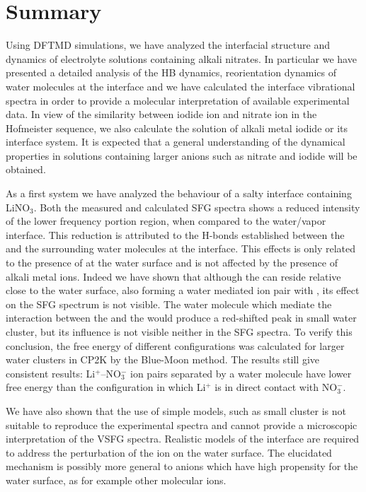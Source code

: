 \chapter{Summary}\label{CHAPTER_Summary}
Using DFTMD simulations, we have analyzed the interfacial structure and dynamics of electrolyte solutions containing alkali nitrates.
In particular we have presented a detailed analysis of the HB dynamics, reorientation dynamics of water molecules at the interface 
and we have calculated the interface vibrational spectra in order to provide a molecular interpretation of available experimental data. 
In view of the similarity between iodide ion and nitrate ion in the Hofmeister sequence, we also calculate the solution of alkali metal iodide
or its interface system. It is expected that a general understanding of the dynamical properties in solutions containing larger anions such as 
nitrate and iodide will be obtained.

As a first system we have analyzed the behaviour of a salty interface containing LiNO$_3$.
Both the measured and calculated SFG spectra shows a reduced intensity of the lower frequency portion region, 
when compared to the water/vapor interface. 
This reduction is attributed to the H-bonds established between the \nitrate and the surrounding water molecules at the interface.
This effects is only related to the presence of \nitrate at the water surface and is not affected by the presence of alkali metal ions.
Indeed we have shown that although the \Li can reside relative close to the water surface, also forming a water mediated
ion pair with \nit, its effect on the SFG spectrum is not visible. The water molecule which mediate the interaction 
between the \nitrate and the \Li would produce a red-shifted peak in small water cluster, but its influence is not visible 
neither in the SFG spectra. To verify this conclusion, the free energy of different configurations was calculated for 
larger water clusters in CP2K by the Blue-Moon method. The results still give consistent results: Li$^+$--NO$_3^-$ ion pairs 
separated by a water molecule have lower free energy than the configuration in which Li$^+$ is in direct contact with NO$_3^-$. 

We have also shown that the use of simple models, such as small cluster is not suitable to reproduce the experimental spectra 
and cannot provide a microscopic interpretation of the VSFG spectra. Realistic models of the interface are required to address the 
perturbation of the ion on the water surface. The elucidated mechanism is possibly more general to anions which have high 
propensity for the water surface, as for example other molecular ions.



